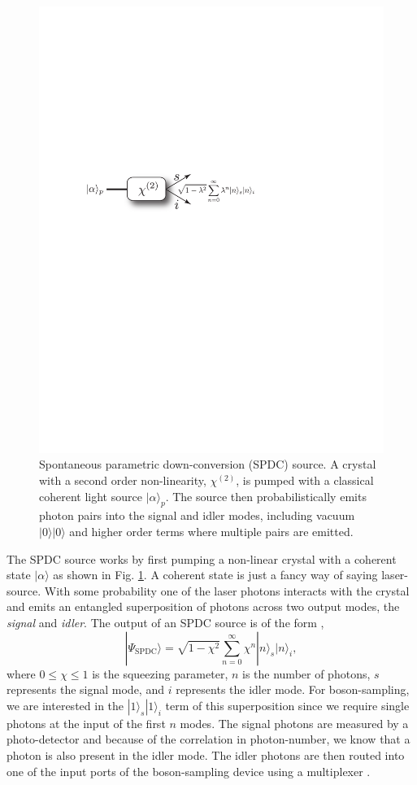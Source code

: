 \documentclass[aps,pra,twocolumn,amsmath,amssymb,nofootinbib,superscriptaddress]{revtex4}
\newcommand{\ket}[1]{|#1\rangle}
\begin{document}
\begin{figure}[!htb]
\includegraphics[width=0.7\columnwidth]{PDC_source}
\caption{Spontaneous parametric down-conversion (SPDC) source. A crystal with a second order non-linearity, $\chi^{(2)}$, is pumped with a classical coherent light source $\ket\alpha_p$. The source then probabilistically emits photon pairs into the signal and idler modes, including vacuum $\ket{0}\ket{0}$ and higher order terms where multiple pairs are emitted.}
\label{fig:SPDC}
\end{figure}

The SPDC source works by first pumping a non-linear crystal with a coherent state $\ket{\alpha}$ as shown in Fig. \ref{fig:SPDC}. A coherent state is just a fancy way of saying laser-source. With some probability one of the laser photons interacts with the crystal and emits an entangled superposition of photons across two output modes, the \emph{signal} and \emph{idler}. The output of an SPDC source is of the form \cite{bib:GerryKnight05},
\begin{equation} \label{SPDC}
\ket{\Psi_\mathrm{SPDC}} = \sqrt{1-\chi^2}\sum_{n=0}^{\infty}\chi^n\ket{n}_s\ket{n}_i,
\end{equation}
where $0\leq\chi\leq1$ is the squeezing parameter, $n$ is the number of photons, $s$ represents the signal mode, and $i$ represents the idler mode. For boson-sampling, we are interested in the $\ket{1}_s\ket{1}_i$ term of this superposition since we require single photons at the input of the first $n$ modes. The signal photons are measured by a photo-detector and because of the correlation in photon-number, we know that a photon is also present in the idler mode. The idler photons are then routed into one of the input ports of the boson-sampling device using a multiplexer \cite{bib:migdall2002tailoring, bib:LPOR201400027, bib:ma2011experimental}.
\end{document}
